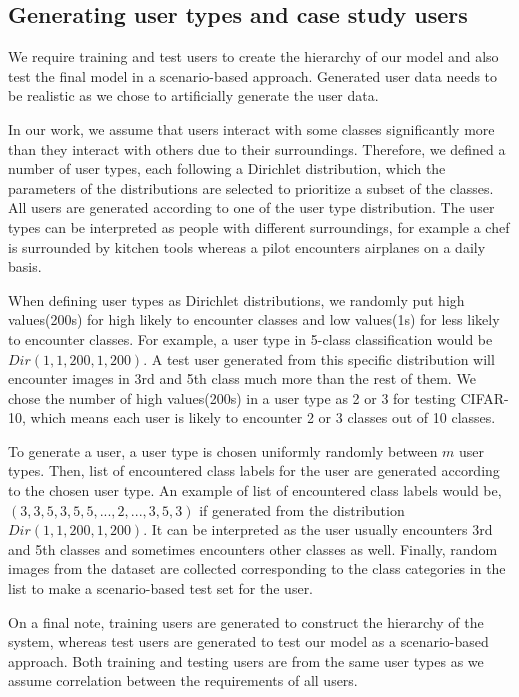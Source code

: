 \subsection{Generating user types and case study users}

\label{ssec:genusers}

We require training and test users to create the hierarchy of our model and also test the final model in a scenario-based approach. 
Generated user data needs to be realistic as we chose to artificially generate the user data.

In our work, we assume that users interact with some classes significantly more than they interact with others due to their surroundings. 
Therefore, we defined a number of user types, each following a Dirichlet distribution, 
which the parameters of the distributions are selected to prioritize a subset of the classes. 
All users are generated according to one of the user type distribution. 
The user types can be interpreted as people with different surroundings, 
for example a chef is surrounded by kitchen tools whereas a pilot encounters airplanes on a daily basis.

When defining user types as Dirichlet distributions, we randomly put high values(200s) for high likely to encounter classes and low values(1s) for less likely to encounter classes. For example, a user type in 5-class classification would be $Dir(1,1,200,1,200)$. 
A test user generated from this specific distribution will encounter images in 3rd and 5th class much more than the rest of them. 
We chose the number of high values(200s) in a user type as 2 or 3 for testing CIFAR-10, which means each user is likely to encounter 2 or 3 classes out of 10 classes. 

To generate a user, a user type is chosen uniformly randomly between $m$ user types. 
Then, list of encountered class labels for the user are generated according to the chosen user type. 
An example of list of encountered class labels would be, $(3,3,5,3,5,5,...,2,...,3,5,3)$ if generated from the distribution $Dir(1,1,200,1,200)$. 
It can be interpreted as the user usually encounters 3rd and 5th classes and sometimes encounters other classes as well.
Finally, random images from the dataset are collected corresponding to the class categories in the list to make a scenario-based test set for the user.

On a final note, training users are generated to construct the hierarchy of the system, whereas test users are generated to test our model as a scenario-based approach. 
Both training and testing users are from the same user types as we assume correlation between the requirements of all users. 

